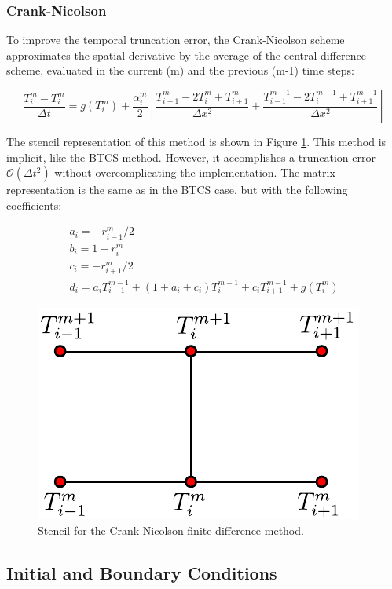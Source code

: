 \subsubsection{Crank-Nicolson}

To improve the temporal truncation error, the Crank-Nicolson scheme approximates the spatial derivative by the average of the central difference scheme, evaluated in the current (m) and the previous (m-1) time steps: 

\begin{equation}
    \frac{T^m_i - T^m_i}{\Delta t} = g(T^m_i) + \frac{\alpha^m_i}{2}\left[ 
          \frac{T^m_{i-1}- 2 T^m_i + T_{i+1}^m}{\Delta x^2} + \frac{T^{m-1}_{i-1}-2T^{m-1}_i+T_{i+1}^{m-1}}{\Delta x^2}
    \right] 
\end{equation}

The stencil representation of this method is shown in Figure \ref{fig:StencilCrNic}. This method is implicit, like the BTCS method. However, it accomplishes a truncation error $\mathcal{O}(\Delta t^2)$ without overcomplicating the implementation. The matrix representation is the same as in the BTCS case, but with the following coefficients:

\begin{equation}
    \begin{gathered}
        a_i = -r^m_{i-1}/2 \\
        b_i = 1 + r^m_{i}\\
        c_i = - r^m_{i+1}/2 \\
        d_i = a_i T_{i-1}^{m-1} + (1 + a_i + c_i) T^{m-1}_{i} + c_i T_{i+1}^{m-1} + g(T_i^m)
    \end{gathered}
\end{equation}

\begin{figure}[h]
    \centering
    \includegraphics[width=0.35\columnwidth]{Stencils_FiniteDifferences/CrkNic.pdf}
    \caption{Stencil for the Crank-Nicolson finite difference method.}
    \label{fig:StencilCrNic}
\end{figure}

\subsection{Initial and Boundary Conditions}

